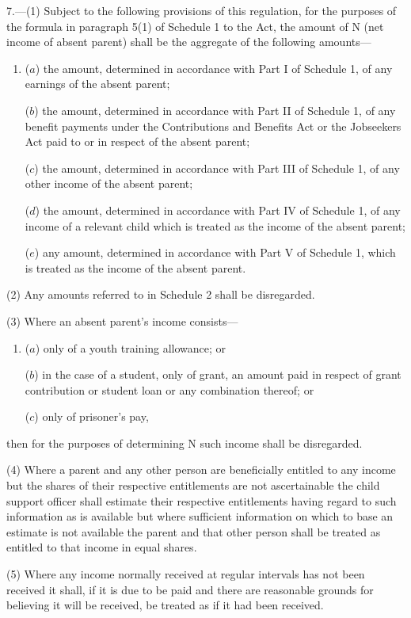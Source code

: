 \documentclass[a4paper]{article}
\begin{document}
7.—(1) Subject to the following provisions of this regulation, for the purposes of the formula in paragraph 5(1) of Schedule 1 to the Act, the amount of N (net income of absent parent) shall be the aggregate of the following amounts—
\begin{enumerate}\item[]
($a$) the amount, determined in accordance with Part I of Schedule 1, of any earnings of the absent parent;

($b$) the amount, determined in accordance with Part II of Schedule 1, of any benefit payments under the Contributions and Benefits Act 
or the Jobseekers Act  %
paid to or in respect of the absent parent;

($c$) the amount, determined in accordance with Part III of Schedule 1, of any other income of the absent parent;

($d$) the amount, determined in accordance with Part IV of Schedule 1, of any income of a relevant child which is treated as the income of the absent parent;

($e$) any amount, determined in accordance with Part V of Schedule 1, which is treated as the income of the absent parent.
\end{enumerate}

(2) Any amounts referred to in Schedule 2 shall be disregarded.

(3) Where an absent parent’s income consists—
\begin{enumerate}\item[]
($a$) only of a youth training allowance; or

($b$) in the case of a student, only of grant, an amount paid in respect of grant contribution or student loan or any combination thereof; or

($c$) only of prisoner’s pay,
\end{enumerate}
then for the purposes of determining N such income shall be disregarded.

(4) Where a parent and any other person are beneficially entitled to any income but the shares of their respective entitlements are not ascertainable the child support officer shall estimate their respective entitlements having regard to such information as is available but where sufficient information on which to base an estimate is not available the parent and that other person shall be treated as entitled to that income in equal shares.

(5) Where any income normally received at regular intervals has not been received it shall, if it is due to be paid and there are reasonable grounds for believing it will be received, be treated as if it had been received.
\end{document}
